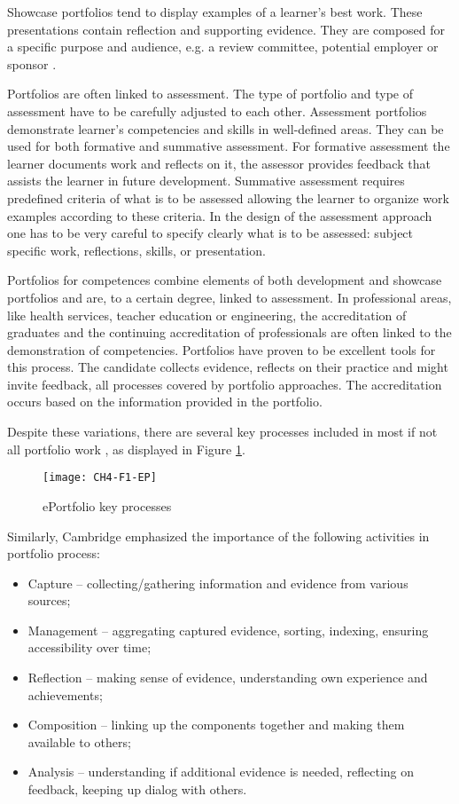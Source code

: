 Showcase portfolios tend to display examples of a learner's best work. These
presentations contain reflection and supporting evidence. They are composed for
a specific purpose and audience, e.g. a review committee, potential employer or
sponsor \citep{Lorenzo2005}.

Portfolios are often linked to assessment. The type of portfolio and type of
assessment have to be carefully adjusted to each other. Assessment portfolios
demonstrate learner's competencies and skills in well-defined areas. They can be
used for both formative and summative assessment. For formative assessment the
learner documents work and reflects on it, the assessor provides feedback that
assists the learner in future development. Summative assessment requires
predefined criteria of what is to be assessed allowing the learner to organize
work examples according to these criteria. In the design of the assessment
approach one has to be very careful to specify clearly what is to be assessed:
subject specific work, reflections, \LLLs skills, or presentation.

Portfolios for competences combine elements of both development and showcase
portfolios and are, to a certain degree, linked to assessment. In professional
areas, like health services, teacher education or engineering, the accreditation
of graduates and the continuing accreditation of professionals are often linked
to the demonstration of competencies. Portfolios have proven to be excellent
tools for this process. The candidate collects evidence, reflects on their
practice and might invite feedback, all processes covered by portfolio
approaches. The accreditation occurs based on the information provided in the
portfolio.

Despite these variations, there are several key processes included in most if
not all portfolio work \citep{Malloff2010, Heinrich2012}, as displayed in
Figure \ref{fig:ep}.

\begin{figure}[htb]
\centering
\texttt{[image: CH4-F1-EP]}
\caption{ePortfolio key processes}
\label{fig:ep}
\end{figure}

Similarly, Cambridge \citeyearpar{Cambridge2010} emphasized the importance of
the following activities in portfolio process:

\begin{itemize}
  \item Capture -- collecting/gathering information and evidence from various
  sources;
  \item Management -- aggregating captured evidence, sorting, indexing, ensuring
  accessibility over time;
  \item Reflection -- making sense of evidence, understanding own experience and
  achievements;
  \item Composition -- linking up the components together and making them
  available to others;
  \item Analysis -- understanding if additional evidence is needed, reflecting
  on feedback, keeping up dialog with others.
\end{itemize}
 
